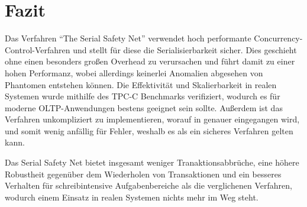 \section{Fazit}
\label{sec:fazit}

Das Verfahren \enquote{The Serial Safety Net} verwendet hoch performante Concurrency-Control-Verfahren und stellt für diese die Serialisierbarkeit sicher.
Dies geschieht ohne einen besonders großen Overhead zu verursachen und führt damit zu einer hohen Performanz, wobei allerdings keinerlei Anomalien abgesehen von Phantomen entstehen können.
Die Effektivität und Skalierbarkeit in realen Systemen wurde mithilfe des TPC-C Benchmarks verifiziert, wodurch es für moderne OLTP-Anwendungen bestens geeignet sein sollte.
Außerdem ist das Verfahren unkompliziert zu implementieren, worauf in \cite{Wang:2015} genauer eingegangen wird, und somit wenig anfällig für Fehler, weshalb es als ein sicheres Verfahren gelten kann.

Das Serial Safety Net bietet insgesamt weniger Tranaktionsabbrüche, eine höhere Robustheit gegenüber dem Wiederholen von Transaktionen und ein besseres Verhalten für schreibintensive Aufgabenbereiche als die verglichenen Verfahren, wodurch einem Einsatz in realen Systemen nichts mehr im Weg steht.